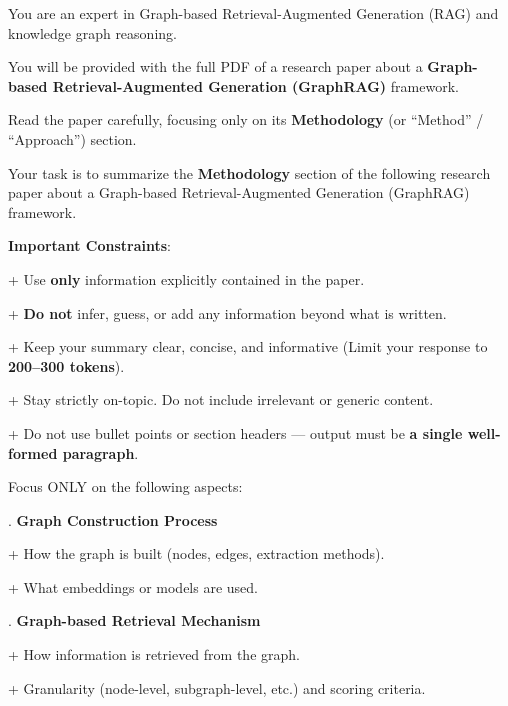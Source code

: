 \begin{tcolorbox}[
    mygreenbox,
    enhanced jigsaw,
    width=\textwidth,
    title={GraphRAG Summary Prompt},
    fonttitle=\Large\bfseries,
    before upper={
        \setlength{\parindent}{0pt}
        \setlength{\parskip}{0pt}
    }
]

You are an expert in Graph-based Retrieval-Augmented Generation (RAG) and knowledge graph reasoning.\par\noindent
You will be provided with the full PDF of a research paper about a \textbf{Graph-based Retrieval-Augmented Generation (GraphRAG)} framework.\par\noindent
Read the paper carefully, focusing only on its \textbf{Methodology} (or “Method” / “Approach”) section.\par\noindent
Your task is to summarize the \textbf{Methodology} section of the following research paper about a Graph-based Retrieval-Augmented Generation (GraphRAG) framework. \par\noindent

\medskip
\textbf{Important Constraints}: \par\noindent
    + Use \textbf{only} information explicitly contained in the paper.\par\noindent
    + \textbf{Do not} infer, guess, or add any information beyond what is written.\par\noindent
    + Keep your summary clear, concise, and informative (Limit your response to \textbf{200–300 tokens}). \par\noindent
    + Stay strictly on-topic. Do not include irrelevant or generic content. \par\noindent
    + Do not use bullet points or section headers — output must be \textbf{a single well-formed paragraph}. \par\noindent

\medskip
Focus ONLY on the following aspects: \par{}. \textbf{Graph Construction Process} \par\noindent
   + How the graph is built (nodes, edges, extraction methods). \par\noindent
   + What embeddings or models are used. \par\noindent

. \textbf{Graph-based Retrieval Mechanism} \par\noindent
   + How information is retrieved from the graph. \par\noindent
   + Granularity (node-level, subgraph-level, etc.) and scoring criteria. \par\noindent


\end{tcolorbox}

